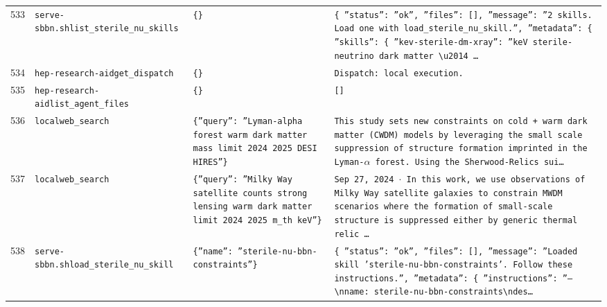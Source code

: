 \documentclass[11pt,a4paper]{article}
\begin{document}
\begin{longtable}{@{}p{}p{}p{}p{}@{}}
533 & \texttt{serve-sbbn.sh}\newline\texttt{list\_\allowbreak{}sterile\_\allowbreak{}nu\_\allowbreak{}skills} & \texttt{\{\}\allowbreak{}} & \texttt{\{   ''status'':\allowbreak{} ''ok'',\allowbreak{}   ''files'':\allowbreak{} []\allowbreak{},\allowbreak{}   ''message'':\allowbreak{} ''2 skills. Load one with load\_\allowbreak{}sterile\_\allowbreak{}nu\_\allowbreak{}skill.'',\allowbreak{}   ''metadata'':\allowbreak{} \{     ''skills'':\allowbreak{} \{       ''kev-sterile-dm-xray'':\allowbreak{} ''keV sterile-neutrino dark matter \textbackslash{}\allowbreak{}u2014 \ldots{}\allowbreak{}} \\
534 & \texttt{hep-research-aid}\newline\texttt{get\_\allowbreak{}dispatch} & \texttt{\{\}\allowbreak{}} & \texttt{Dispatch:\allowbreak{} local execution.} \\
535 & \texttt{hep-research-aid}\newline\texttt{list\_\allowbreak{}agent\_\allowbreak{}files} & \texttt{\{\}\allowbreak{}} & \texttt{[]\allowbreak{}} \\
536 & \texttt{local}\newline\texttt{web\_\allowbreak{}search} & \texttt{\{''query'':\allowbreak{} ''Lyman-alpha forest warm dark matter mass limit 2024 2025 DESI HIRES''\}\allowbreak{}} & \texttt{This study sets new constraints on cold + warm dark matter (CWDM)\allowbreak{} models by leveraging the small scale suppression of structure formation imprinted in the Lyman-$\alpha$ forest. Using the Sherwood-Relics sui\ldots{}\allowbreak{}} \\
537 & \texttt{local}\newline\texttt{web\_\allowbreak{}search} & \texttt{\{''query'':\allowbreak{} ''Milky Way satellite counts strong lensing warm dark matter limit 2024 2025 m\_\allowbreak{}th keV''\}\allowbreak{}} & \texttt{Sep 27,\allowbreak{} 2024 $\cdot$ In this work,\allowbreak{} we use observations of Milky Way satellite galaxies to constrain MWDM scenarios where the formation of small-scale structure is suppressed either by generic thermal relic \ldots{}\allowbreak{}} \\
538 & \texttt{serve-sbbn.sh}\newline\texttt{load\_\allowbreak{}sterile\_\allowbreak{}nu\_\allowbreak{}skill} & \texttt{\{''name'':\allowbreak{} ''sterile-nu-bbn-constraints''\}\allowbreak{}} & \texttt{\{   ''status'':\allowbreak{} ''ok'',\allowbreak{}   ''files'':\allowbreak{} []\allowbreak{},\allowbreak{}   ''message'':\allowbreak{} ''Loaded skill 'sterile-nu-bbn-constraints'. Follow these instructions.'',\allowbreak{}   ''metadata'':\allowbreak{} \{     ''instructions'':\allowbreak{} ''---\textbackslash{}\allowbreak{}nname:\allowbreak{} sterile-nu-bbn-constraints\textbackslash{}\allowbreak{}ndes\ldots{}\allowbreak{}} \\

\end{longtable}
\end{document}
